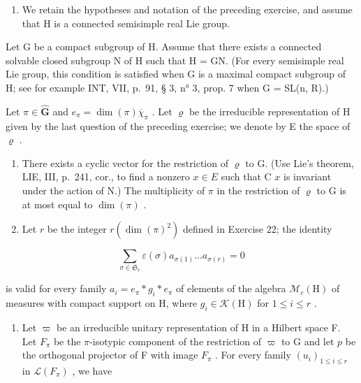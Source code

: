\begin{enumerate}
\def\labelenumi{\arabic{enumi})}
\setcounter{enumi}{22}
\tightlist
\item
  We retain the hypotheses and notation of the preceding exercise, and assume that H is a connected semisimple real Lie group.
\end{enumerate}

Let G be a compact subgroup of H. Assume that there exists a connected solvable closed subgroup N of H such that H = GN. (For every semisimple real Lie group, this condition is satisfied when G is a maximal compact subgroup of H; see for example INT, VII, p.~91, § 3, n° 3, prop. 7 when G = SL(n, R).)

Let \(\pi \in \widehat{\mathbf{G}}\) and \(e_{\pi} = \dim (\pi)\overline{\chi}_{\pi}\) . Let \(\varrho\) be the irreducible representation of H given by the last question of the preceding exercise; we denote by E the space of \(\varrho\) .

\begin{enumerate}
\def\labelenumi{\alph{enumi})}
\item
  There exists a cyclic vector for the restriction of \(\varrho\) to G. (Use Lie's theorem, LIE, III, p.~241, cor., to find a nonzero \(x \in E\) such that C \(x\) is invariant under the action of N.) The multiplicity of \(\pi\) in the restriction of \(\varrho\) to G is at most equal to \(\dim(\pi)\) .
\item
  Let \(r\) be the integer \(r(\dim (\pi)^2)\) defined in Exercise 22; the identity
\end{enumerate}

\[
\sum_ {\sigma \in \mathfrak {S} _ {r}} \varepsilon (\sigma) a _ {\sigma (1)} \dots a _ {\sigma (r)} = 0
\]

is valid for every family \(a_{i}=e_{\pi}*g_{i}*e_{\pi}\) of elements of the algebra \(\mathcal{M}_{c}(\mathrm{H})\) of measures with compact support on H, where \(g_{i}\in\mathcal{K}(\mathrm{H})\) for \(1\leqslant i\leqslant r\) .

\begin{enumerate}
\def\labelenumi{\alph{enumi})}
\setcounter{enumi}{2}
\tightlist
\item
  Let \(\varpi\) be an irreducible unitary representation of H in a Hilbert space F. Let \(F_{\pi}\) be the \(\pi\)-isotypic component of the restriction of \(\varpi\) to G and let \(p\) be the orthogonal projector of F with image \(F_{\pi}\) . For every family \((u_i)_{1 \leqslant i \leqslant r}\) in \(\mathcal{L}(F_{\pi})\) , we have
\end{enumerate}

